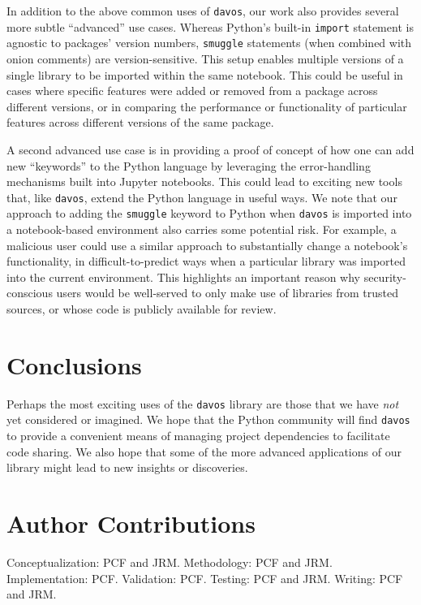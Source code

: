 \documentclass[preprint,12pt, a4paper]{elsarticle}
\begin{document}
In addition to the above common uses of \texttt{davos}, our work also
provides several more subtle ``advanced'' use cases.  
Whereas Python's built-in \texttt{import} statement is agnostic to
packages' version numbers, \texttt{smuggle} statements (when combined
with onion comments) are version-sensitive.  This setup enables
multiple versions of a single library to be imported within the same
notebook.  This could be useful in cases where specific features were
added or removed from a package across different versions, or in
comparing the performance or functionality of particular features
across different versions of the same package.

A second advanced use case is in providing a proof of concept of how
one can add new ``keywords'' to the Python language by leveraging the
error-handling mechanisms built into Jupyter notebooks.  This could
lead to exciting new tools that, like \texttt{davos}, extend the
Python language in useful ways.  We note that our approach to adding
the \texttt{smuggle} keyword to Python when \texttt{davos} is imported
into a notebook-based environment also carries some potential risk.
For example, a malicious user could use a similar approach to
substantially change a notebook's functionality, in
difficult-to-predict ways when a particular library was imported into
the current environment.  This highlights an important reason why
security-conscious users would be well-served to only make use of
libraries from trusted sources, or whose code is publicly available
for review.

\section{Conclusions}

Perhaps the most exciting uses of the \texttt{davos} library are those
that we have \textit{not} yet considered or imagined.  We hope that
the Python community will find \texttt{davos} to provide a convenient
means of managing project dependencies to facilitate code sharing.  We
also hope that some of the more advanced applications of our library
might lead to new insights or discoveries.


\section*{Author Contributions}
Conceptualization: PCF and JRM.  Methodology: PCF and JRM.
Implementation: PCF.  Validation: PCF.  Testing: PCF and JRM.
Writing: PCF and JRM.
\end{document}
